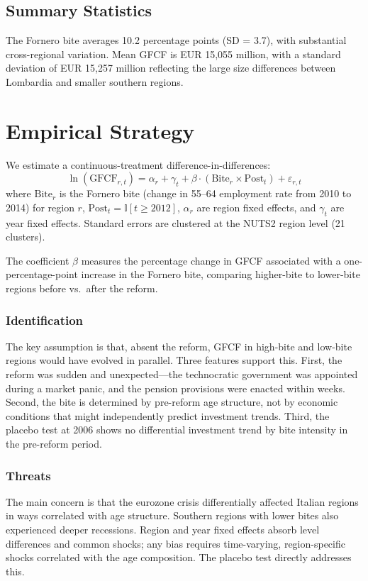 \documentclass[12pt]{article}
\newcommand{\ind}{\mathbb{I}}
\begin{document}
\subsection{Summary Statistics}



The Fornero bite averages 10.2 percentage points (SD = 3.7), with substantial cross-regional variation. Mean GFCF is EUR 15,055 million, with a standard deviation of EUR 15,257 million reflecting the large size differences between Lombardia and smaller southern regions.


\section{Empirical Strategy}

We estimate a continuous-treatment difference-in-differences:
\begin{equation}
\ln(\text{GFCF}_{r,t}) = \alpha_r + \gamma_t + \beta \cdot (\text{Bite}_r \times \text{Post}_t) + \varepsilon_{r,t}
\label{eq:did}
\end{equation}
where $\text{Bite}_r$ is the Fornero bite (change in 55--64 employment rate from 2010 to 2014) for region $r$, $\text{Post}_t = \ind[t \geq 2012]$, $\alpha_r$ are region fixed effects, and $\gamma_t$ are year fixed effects. Standard errors are clustered at the NUTS2 region level (21 clusters).

The coefficient $\beta$ measures the percentage change in GFCF associated with a one-percentage-point increase in the Fornero bite, comparing higher-bite to lower-bite regions before vs.\ after the reform.

\subsubsection*{Identification} The key assumption is that, absent the reform, GFCF in high-bite and low-bite regions would have evolved in parallel. Three features support this. First, the reform was sudden and unexpected---the technocratic government was appointed during a market panic, and the pension provisions were enacted within weeks. Second, the bite is determined by pre-reform age structure, not by economic conditions that might independently predict investment trends. Third, the placebo test at 2006 shows no differential investment trend by bite intensity in the pre-reform period.

\subsubsection*{Threats} The main concern is that the eurozone crisis differentially affected Italian regions in ways correlated with age structure. Southern regions with lower bites also experienced deeper recessions. Region and year fixed effects absorb level differences and common shocks; any bias requires time-varying, region-specific shocks correlated with the age composition. The placebo test directly addresses this.
\end{document}
